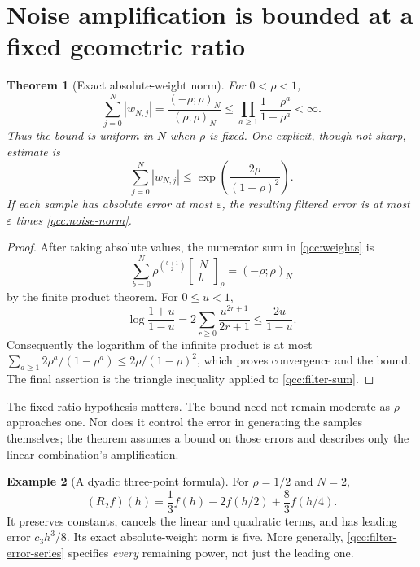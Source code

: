 \documentclass[11pt,a4paper,oneside,openany]{book}
\newtheorem{theorem}{Theorem}[chapter]
\theoremstyle{definition}
\newtheorem{example}[theorem]{Example}
\theoremstyle{remark}
\newcommand{\GB}[3][q]{\begin{bmatrix}#2\\#3\end{bmatrix}_{#1}}
\begin{document}
\section{Noise amplification is bounded at a fixed geometric ratio}
\begin{theorem}[Exact absolute-weight norm]\label{qcc:filter-noise}
For \(0<\rho<1\),
\begin{equation}\label{qcc:noise-norm}
 \sum_{j=0}^{N}|w_{N,j}|
       =\frac{(-\rho;\rho)_N}{(\rho;\rho)_N}
       \le\prod_{a\ge1}\frac{1+\rho^a}{1-\rho^a}<\infty.
\end{equation}
Thus the bound is uniform in \(N\) when \(\rho\) is fixed. One explicit,
though not sharp, estimate is
\begin{equation}\label{qcc:noise-simple-bound}
 \sum_{j=0}^{N}|w_{N,j}|
       \le\exp\left(\frac{2\rho}{(1-\rho)^2}\right).
\end{equation}
If each sample has absolute error at most \(\varepsilon\), the resulting
filtered error is at most \(\varepsilon\) times
\eqref{qcc:noise-norm}.
\end{theorem}
\begin{proof}
After taking absolute values, the numerator sum in \eqref{qcc:weights} is
\[
 \sum_{b=0}^{N}\rho^{\binom{b+1}{2}}\GB[\rho]Nb
       =(-\rho;\rho)_N
\]
by the finite product theorem. For \(0\le u<1\),
\[
 \log\frac{1+u}{1-u}
 =2\sum_{r\ge0}\frac{u^{2r+1}}{2r+1}
 \le\frac{2u}{1-u}.
\]
Consequently the logarithm of the infinite product is at most
\(\sum_{a\ge1}2\rho^a/(1-\rho^a)
 \le2\rho/(1-\rho)^2\), which proves convergence and the bound.
The final assertion is the triangle inequality applied to
\eqref{qcc:filter-sum}.
\end{proof}

The fixed-ratio hypothesis matters. The bound need not remain moderate as
\(\rho\) approaches one. Nor does it control the error in generating the
samples themselves; the theorem assumes a bound on those errors and describes
only the linear combination's amplification.

\begin{example}[A dyadic three-point formula]
For \(\rho=1/2\) and \(N=2\),
\begin{equation}\label{qcc:dyadic-filter}
 (R_2f)(h)=\frac13 f(h)-2f(h/2)+\frac83f(h/4).
\end{equation}
It preserves constants, cancels the linear and quadratic terms, and has leading
error \(c_3h^3/8\). Its exact absolute-weight norm is five. More generally,
\eqref{qcc:filter-error-series} specifies \emph{every} remaining power,
not just the leading one.
\end{example}
\end{document}
